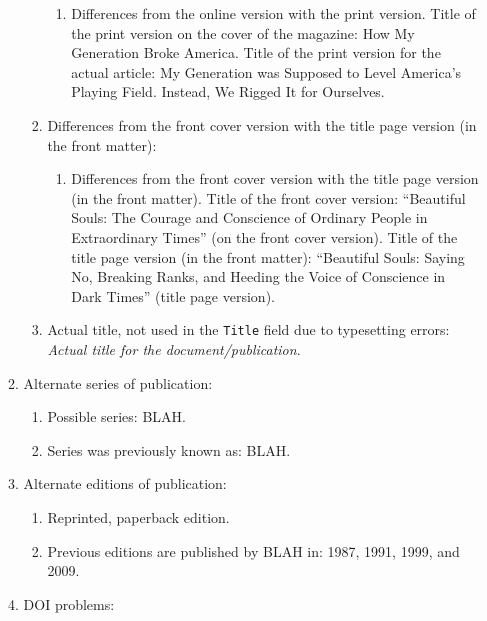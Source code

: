\documentclass[letter,12pt]{article}
\begin{document}
\begin{enumerate}
\begin{enumerate}
\begin{enumerate}
\begin{enumerate}
			\item Differences from the online version with the print version. Title of the print version on the cover of the magazine: How My Generation Broke America. Title of the print version for the actual article: My Generation was Supposed to Level America's Playing Field. Instead, We Rigged It for Ourselves.
			\end{enumerate}
		\item Differences from the front cover version with the title page version (in the front matter): \vspace{-0.1cm}
			\begin{enumerate} \itemsep -1pt
			\item Differences from the front cover version with the title page version (in the front matter). Title of the front cover version: ``Beautiful Souls: The Courage and Conscience of Ordinary People in Extraordinary Times'' (on the front cover version). Title of the title page version (in the front matter): ``Beautiful Souls: Saying No, Breaking Ranks, and Heeding the Voice of Conscience in Dark Times'' (title page version).
			\end{enumerate}
		\item Actual title, not used in the {\tt Title} field due to typesetting errors: {\it Actual title for the document/publication}.
		\end{enumerate}
	\item Alternate series of publication: \vspace{-0.2cm}
		\begin{enumerate} \itemsep -2pt
		\item Possible series: BLAH.
		\item Series was previously known as: BLAH.
		\end{enumerate}
	\item Alternate editions of publication: \vspace{-0.2cm}
		\begin{enumerate} \itemsep -2pt
		\item Reprinted, paperback edition.
		\item Previous editions are published by BLAH in: 1987, 1991, 1999, and 2009.
		\end{enumerate}
	\item DOI problems: \vspace{-0.2cm}
		\begin{enumerate} \itemsep -2pt

\end{enumerate}
\end{enumerate}
\end{enumerate}
\end{document}
